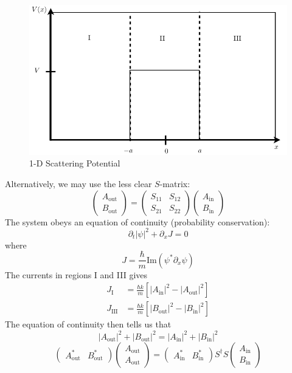 \documentclass{article}
\begin{document}
\begin{figure}[h]
	\centering
	\includegraphics{Fig_1.pdf}
	\caption{1-D Scattering Potential}
\end{figure}
Alternatively, we may use the less clear $S$-matrix:
			$$\left(\begin{array}{c}A_{\mathrm{out}} \\B_{\mathrm{out}}\end{array}\right)=\left(\begin{array}{cc}S_{11} & S_{12} \\S_{21} & S_{22}\end{array}\right)\left(\begin{array}{c}A_{\mathrm{in}} \\B_{\mathrm{in}}\end{array}\right)$$
			The system obeys an equation of continuity (probability conservation):
			$$\partial_t\left|\psi\right|^2+\partial_xJ=0$$
			where
			$$J=\frac{\hbar}{m}\mathrm{Im}\left(\psi^*\partial_x\psi\right)$$
			The currents in regions I and III gives
			\begin{align*}
				J_{\mathrm{I}}&=\frac{\hbar k}{m}\left[\left|A_{\mathrm{in}}\right|^2-\left|A_{\mathrm{out}}\right|^2\right]\\
				J_{\mathrm{III}}&=\frac{\hbar k}{m}\left[\left|B_{\mathrm{out}}\right|^2-\left|B_{\mathrm{in}}\right|^2\right]
			\end{align*}
			The equation of continuity then tells us that
			$$\left|A_{\mathrm{out}}\right|^2+\left|B_{\mathrm{out}}\right|^2=\left|A_{\mathrm{in}}\right|^2+\left|B_{\mathrm{in}}\right|^2$$
			$$\left(\begin{array}{cc}A_{\mathrm{out}}^* & B_{\mathrm{out}}^*\end{array}\right)\left(\begin{array}{c}A_{\mathrm{out}} \\A_{\mathrm{out}}\end{array}\right)=\left(\begin{array}{cc}A_{\mathrm{in}}^* & B_{\mathrm{in}}^*\end{array}\right)S^\dagger S\left(\begin{array}{c}A_{\mathrm{in}} \\B_{\mathrm{in}}\end{array}\right)$$
\end{document}
